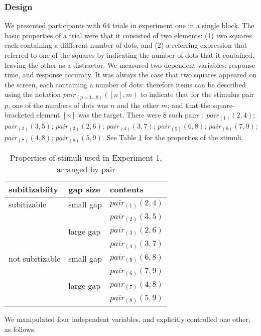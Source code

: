 \documentclass[man,floatmark]{apa}
\begin{document}
\subsubsection{Design}
We presented participants with 64 trials in experiment one in a single block. The basic properties of a trial were that it consisted of two elements: (1) two squares each containing a diffferent number of dots, and (2) a referring expression that referred to one of the squares by indicating the number of dots that it contained, leaving the other as a distractor. We measured two dependent variables: response time, and response accuracy. It was always the case that two squares appeared on the screen, each containing a number of dots: therefore items can be described using the notation $pair_{(p=1... 8)}([n],m)$ to indicate that for the stimulus pair $p$, one of the numbers of dots was $n$ and the other $m$; and that the square-bracketed element $[n]$ was the target. There were 8 such pairs : $pair_{(1)}(2,4)$; $pair_{(2)}(3,5)$; $pair_{(3)}(2,6)$; $pair_{(4)}(3,7)$; $pair_{(5)}(6,8)$; $pair_{(6)}(7,9)$; $pair_{(7)}(4,8)$; $pair_{(8)}(5,9)$. See Table \ref{tablee1} for the properties of the stimuli.

\begin{table}[tbp]
\caption{Properties of stimuli used in Experiment 1, arranged by pair}
\label{tablee1}
\begin{tabular}{lll}
subitizabiity	& gap size  	&	contents\\
\hline
subitizable	&small gap	&	$pair_{(1)}(2,4)$\\
 			&			&	$pair_{(2)}(3,5)$\\
\hline
			&large gap	&	$pair_{(3)}(2,6)$\\
			&			&	$pair_{(4)}(3,7)$\\
\hline
not subitizable	&small gap	&	$pair_{(5)}(6,8)$\\
			&			&	$pair_{(6)}(7,9)$\\
\hline
			&large gap	&	$pair_{(7)}(4,8)$\\
			&			&	$pair_{(8)}(5,9)$\\
\hline
\end{tabular}
\end{table}

We manipulated four independent variables, and explicitly controlled one other, as follows. 
\end{document}
